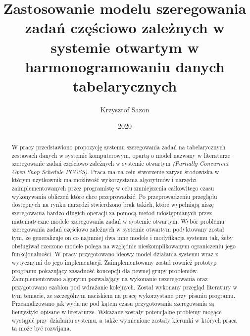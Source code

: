 \documentclass[brudnopis]{xmgr}
\author   {Krzysztof Sazon}
\title    {Zastosowanie modelu szeregowania zadań częściowo zależnych w systemie otwartym w harmonogramowaniu danych tabelarycznych}
\date     {2020}
\begin{document}
\begin{abstract}
W pracy przedstawiono propozycję systemu szeregowania zadań na tabelarycznych zestawach danych w systemie komputerowym, opartą o model nazwany w literaturze szeregowanie zadań częściowo zależnych w systemie otwartym \emph{ (Partially Concurrent Open Shop Schedule PCOSS)}.
Praca ma na celu stworzenie zarysu środowiska w którym użytkownik ma możliwość wykorzystania algorytmów i narzędzi zaimplementowanych przez programistę w celu zmniejszenia całkowitego czasu wykonywania obliczeń które chce przeprowadzić.
Po przeprowadzeniu przeglądu dostępnych na rynku narzędzi stwierdzono brak takich, które wypełniają niszę szeregowania bardzo długich operacji za pomocą metod udostępnianych przez matematyczne modele szeregowania zadań w systemie otwartym.
Wybór problemu szeregowania zadań częściowo zależnych w systemie otwartym podyktowany został tym, że generalizuje on co najmniej dwa inne modele i modyfikacja systemu tak, żeby obsługiwał rzeczone modele polega na względnie nieskomplikowanym ograniczeniu jego funkcjonalności.
W pracy przygotowano ideowy model działania systemu wraz z wytycznymi do jego implementacji.
Zaimplementowany został również prototyp programu pokazujący zasadność koncepcji dla pewnej grupy problemów.
Zaimplementowano algorytm pozwalający na wykonanie uszeregowania oraz przygotowano szablon pod wdrażanie kolejnych.
Został wykonany przegląd literatury w tym temacie, ze szczególnym naciskiem na pracę wykorzystane przy pisaniu programu.
Przeanalizowano jak wydajne pod kątem czasu przygotowania szeregowania są heurystyki opisane w literaturze.
Wskazane zostały potencjalne problemy mogące wystąpić przy działaniu systemu, a także wymienione zostały kierunki w których praca ta może być rozwijana.
\end{abstract}


\maketitle

\introduction
\end{document}
